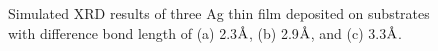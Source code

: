 \begingroup
\begin{figure}[!ht]
  \centering

  \label{Chap:Ag/ZnO:fig:10d}
  \label{Chap:Ag/ZnO:fig:10e}
  \label{Chap:Ag/ZnO:fig:10f}

\caption[Simulated \ac{XRD} results of Ag thin film morphology on square substrates.]{Simulated \ac{XRD} results of three Ag thin film deposited on substrates with difference bond length of (a) 2.3$\mbox{\normalfont\AA}$, (b) 2.9$\mbox{\normalfont\AA}$, and (c) 3.3$\mbox{\normalfont\AA}$.}
  \label{Chap:Ag/ZnO:fig10-2}
\end{figure}
\endgroup


